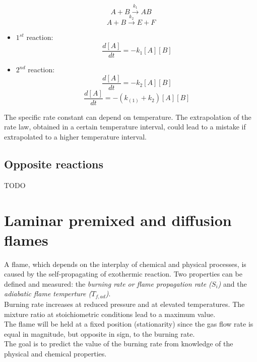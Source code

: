 \documentclass[12pt]{article}
\begin{document}
\begin{equation}
    A+B\xrightarrow{k_{1}}AB
\end{equation}
\begin{equation}
    A+B\xrightarrow{k_{2}}E+F
\end{equation}

\begin{itemize}
    \item $1^{st}$ reaction:
    \begin{equation}
        \frac{d[A]}{dt}=-k_{1}[A][B]
    \end{equation}
     \item $2^{nd}$ reaction:
    \begin{equation}
        \frac{d[A]}{dt}=-k_{2}[A][B]
    \end{equation}
    \begin{equation}
        \frac{d[A]}{dt}=-(k_(1)+k_{2})[A][B]
    \end{equation}
\end{itemize}
The specific rate constant can depend on temperature. The extrapolation of the rate law, obtained in a certain temperature interval, could lead to a mistake if extrapolated to a higher temperature interval.

\subsection{Opposite reactions}

TODO

\newpage

\section{Laminar premixed and diffusion flames}

A flame, which depends on the interplay of chemical and physical processes, is caused by the self-propagating of exothermic reaction. Two properties can be defined and measured: the \textit{burning rate or flame propagation rate ($S_{i}$)} and the \textit{adiabatic flame temperture ($T_{f,ad}$)}. \\
Burning rate increases at reduced pressure and at elevated temperatures. The mixture ratio at stoichiometric conditions lead to a maximum value.\\
The flame will be held at a fixed position (stationarity) since the gas flow rate is equal in magnitude, but opposite in sign, to the burning rate.\\
The goal is to predict the value of the burning rate from knowledge of the physical and chemical properties.
\end{document}

